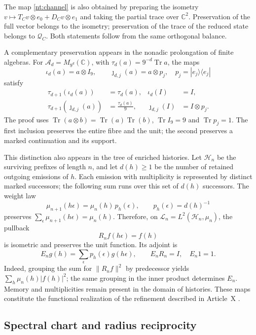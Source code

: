 The map \eqref{nt:channel} is also obtained by
preparing the isometry
\(v\mapsto T_Cv\otimes e_0+D_Cv\otimes e_1\) and taking
the partial trace over \(\mathbb C^2\).
Preservation of the full vector belongs to the isometry;
preservation of the trace of the reduced state belongs to
\(\mathcal Q_C\). Both statements follow from the same
orthogonal balance.

A complementary preservation appears in the nonadic
prolongation of finite algebras. For
\(\mathcal A_d=M_{9^d}(\mathbb C)\), with
\(\tau_d(a)=9^{-d}\operatorname{Tr}a\), the maps
\[
 \iota_d(a)=a\otimes I_9,\qquad
 \jmath_{d,j}(a)=a\otimes p_j,
 \quad p_j=|e_j\rangle\langle e_j|
\]
satisfy
\begin{align}
 \tau_{d+1}(\iota_d(a))&=\tau_d(a),
 &\iota_d(I)&=I,\label{nt:unital-trace}\\
 \tau_{d+1}(\jmath_{d,j}(a))&=\frac{\tau_d(a)}9,
 &\jmath_{d,j}(I)&=I\otimes p_j.\label{nt:corner-trace}
\end{align}
The proof uses
\(\operatorname{Tr}(a\otimes b)=
\operatorname{Tr}(a)\operatorname{Tr}(b)\),
\(\operatorname{Tr}I_9=9\) and \(\operatorname{Tr}p_j=1\).
The first inclusion preserves the entire fibre and the unit;
the second preserves a marked continuation and its support.

This distinction also appears in the tree of
enriched histories. Let \(\mathcal H_n\) be the surviving
prefixes of length \(n\), and let \(d(h)\geq1\) be the number of
retained outgoing emissions of \(h\). Each emission with multiplicity
is represented by distinct marked successors; the following sum runs over
this set of \(d(h)\) successors.
The weight law
\[
 \mu_{n+1}(h\epsilon)=\mu_n(h)\,p_h(\epsilon),
 \qquad p_h(\epsilon)=d(h)^{-1}
\]
preserves
\(\sum_{\epsilon}\mu_{n+1}(h\epsilon)=\mu_n(h)\).
Therefore, on
\(\mathscr L_n=L^2(\mathcal H_n,\mu_n)\), the pullback
\[
 R_nf(h\epsilon)=f(h)
\]
is isometric and preserves the unit function. Its adjoint is
\[
 E_ng(h)=\sum_{\epsilon}p_h(\epsilon)g(h\epsilon),
 \qquad E_nR_n=I,\quad E_n1=1.
\]
Indeed, grouping the sum for \(\|R_nf\|^2\) by predecessor
yields \(\sum_h\mu_n(h)|f(h)|^2\); the same grouping
in the inner product determines \(E_n\).
Memory and multiplicities remain present in the
domain of histories. These maps constitute the
functional realization of the refinement described in
Article~X \cite{hmtX}.

\subsection{Spectral chart and radius reciprocity}

